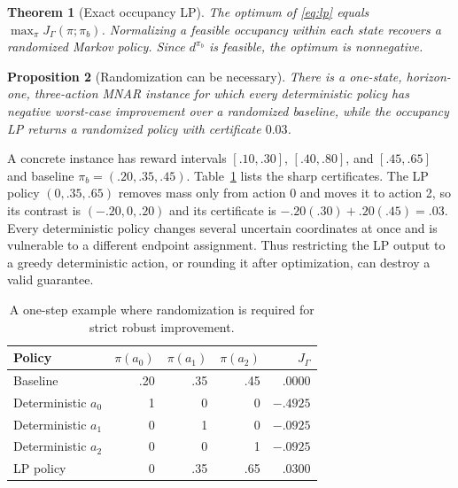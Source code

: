 \documentclass[letterpaper]{article}
\newtheorem{theorem}{Theorem}
\newtheorem{proposition}[theorem]{Proposition}
\theoremstyle{remark}
\begin{document}
\begin{theorem}[Exact occupancy LP]\label{thm:lp}
The optimum of \eqref{eq:lp} equals $\max_\pi J_\Gamma(\pi;\pi_b)$. Normalizing a feasible occupancy within each state recovers a randomized Markov policy. Since $d^{\pi_b}$ is feasible, the optimum is nonnegative.
\end{theorem}

\begin{proposition}[Randomization can be necessary]\label{prop:randomization}
There is a one-state, horizon-one, three-action MNAR instance for which every deterministic policy has negative worst-case improvement over a randomized baseline, while the occupancy LP returns a randomized policy with certificate $0.03$.
\end{proposition}

A concrete instance has reward intervals
$[.10,.30]$, $[.40,.80]$, and $[.45,.65]$ and baseline
$\pi_b=(.20,.35,.45)$. Table~\ref{tab:randomization} lists the sharp certificates. The LP policy $(0,.35,.65)$ removes mass only from action 0 and moves it to action 2, so its contrast is $(-.20,0,.20)$ and its certificate is
$-.20(.30)+.20(.45)=.03$. Every deterministic policy changes several uncertain coordinates at once and is vulnerable to a different endpoint assignment. Thus restricting the LP output to a greedy deterministic action, or rounding it after optimization, can destroy a valid guarantee.

\begin{table}[t]
\centering
\small
\caption{A one-step example where randomization is required for strict robust improvement.}
\label{tab:randomization}
\begin{tabular}{lrrrr}
\toprule
Policy & $\pi(a_0)$ & $\pi(a_1)$ & $\pi(a_2)$ & $J_\Gamma$ \\
\midrule
Baseline & .20 & .35 & .45 & .0000 \\
Deterministic $a_0$ & 1 & 0 & 0 & $-.4925$ \\
Deterministic $a_1$ & 0 & 1 & 0 & $-.0925$ \\
Deterministic $a_2$ & 0 & 0 & 1 & $-.0925$ \\
LP policy & 0 & .35 & .65 & $\mathbf{.0300}$ \\
\bottomrule
\end{tabular}
\end{table}
\end{document}
